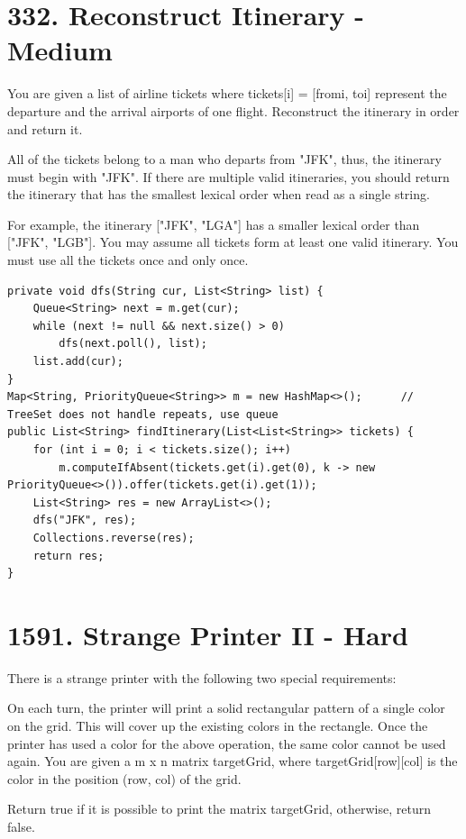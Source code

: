 \documentclass[9pt, b5paaper]{book}
\begin{document}
\section{332. Reconstruct Itinerary - Medium}
\label{sec-18-6}
You are given a list of airline tickets where tickets[i] = [fromi, toi] represent the departure and the arrival airports of one flight. Reconstruct the itinerary in order and return it.

All of the tickets belong to a man who departs from "JFK", thus, the itinerary must begin with "JFK". If there are multiple valid itineraries, you should return the itinerary that has the smallest lexical order when read as a single string.

For example, the itinerary ["JFK", "LGA"] has a smaller lexical order than ["JFK", "LGB"].
You may assume all tickets form at least one valid itinerary. You must use all the tickets once and only once.
\begin{verbatim}
private void dfs(String cur, List<String> list) {
    Queue<String> next = m.get(cur);
    while (next != null && next.size() > 0) 
        dfs(next.poll(), list);
    list.add(cur);
}
Map<String, PriorityQueue<String>> m = new HashMap<>();      // TreeSet does not handle repeats, use queue
public List<String> findItinerary(List<List<String>> tickets) {
    for (int i = 0; i < tickets.size(); i++) 
        m.computeIfAbsent(tickets.get(i).get(0), k -> new PriorityQueue<>()).offer(tickets.get(i).get(1));
    List<String> res = new ArrayList<>();
    dfs("JFK", res);
    Collections.reverse(res);
    return res;
}
\end{verbatim}

\section{1591. Strange Printer II - Hard}
\label{sec-18-7}
There is a strange printer with the following two special requirements:

On each turn, the printer will print a solid rectangular pattern of a single color on the grid. This will cover up the existing colors in the rectangle.
Once the printer has used a color for the above operation, the same color cannot be used again.
You are given a m x n matrix targetGrid, where targetGrid[row][col] is the color in the position (row, col) of the grid.

Return true if it is possible to print the matrix targetGrid, otherwise, return false.
\end{document}
